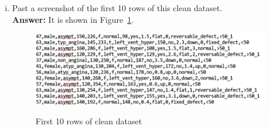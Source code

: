 \documentclass[11pt, final]{article}
\begin{document}
\begin{enumerate}[(a)]
\begin{enumerate}[(i)]
\textbf{Answer:} \\
I use filter \textbf{RemoveWithValues}, in the setting of this filter, \textbf{splitPoint} is used to filter numeric values, instances with values smaller than given value will be selected; \textbf{invertSelection} is used to invert the selection; \textbf{matchMissingValues} is sued to match instances with missing values. Note that it is independent of \textbf{invertSelection}, i.e., \textbf{invertSelection} will not affect the selection result of \textbf{matchMissingValues}.

I takes the following steps to filter the missing value instances:
\begin{itemize}
\item step 1: Choose \textbf{RemoveWithValues} filter, select the attributes which contains the most missing instances (attribute ca, index 12), set \textbf{matchMissingValues} as true, the final setting is, "RemoveWithValues -S 0.0 -C 12 -L first-last M". After this step, there are only 301 instances remaining.
\item Step 2: continue to select attributes to match missing values until there are no missing values in the instances. I select attribute \textbf{thal} next, note that since it is not numeric value, all its instances will be selected if the split point is set as 0.0, thus we need to set the  \textbf{invertSelection} as true to invert the selection. Finally, there are 297 instances remaining.
\end{itemize}

\item Past a screenshot of the first 10 rows of this clean dataset. \\

\textbf{Answer: } It is shown in Figure~\ref{fig: clean}.
\begin{figure}[!ht]
  \caption{First 10 rows of clean dataset}
  \centering
   \includegraphics[width=0.98\textwidth]{filter-missing-values.PNG}
   \label{fig: clean}
\end{figure}

\end{enumerate}


\end{enumerate}
\end{document}
